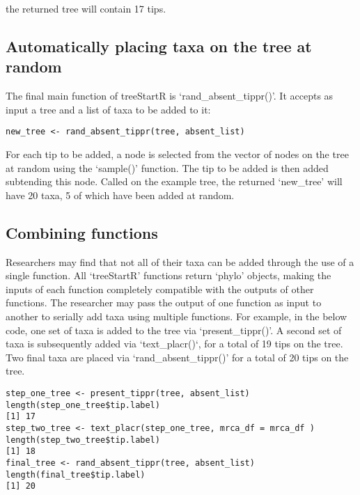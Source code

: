 \documentclass[11pt]{article}
\begin{document}
the returned tree will contain 17 tips.

\subsection{Automatically placing taxa on the tree at random}

The final main function of treeStartR is `rand\_absent\_tippr()'. 
It accepts as input a tree and a list of taxa to be added to it:

{\tt \begin{snugshade*}
\begin{lstlisting}
new_tree <- rand_absent_tippr(tree, absent_list)
\end{lstlisting}
\end{snugshade*}}

For each tip to be added, a node is selected from the vector of nodes on the tree at random using the `sample()' function.
The tip to be added is then added subtending this node.
Called on the example tree, the returned `new\_tree' will have 20 taxa, 5 of which have been added at random.

\subsection{Combining functions}

Researchers may find that not all of their taxa can be added through the use of a single function.
All `treeStartR' functions return `phylo' objects, making the inputs of each function completely compatible with the outputs of other functions.
The researcher may pass the output of one function as input to another to serially add taxa using multiple functions.
For example, in the below code, one set of taxa is added to the tree via `present\_tippr()'.
A second set of taxa is subsequently added via `text\_placr()`, for a total of 19 tips on the tree.
Two final taxa are placed via `rand\_absent\_tippr()' for a total of 20 tips on the tree.

 {\tt \begin{snugshade*}
\begin{lstlisting}
step_one_tree <- present_tippr(tree, absent_list)
length(step_one_tree$tip.label)
[1] 17
step_two_tree <- text_placr(step_one_tree, mrca_df = mrca_df )
length(step_two_tree$tip.label)
[1] 18
final_tree <- rand_absent_tippr(tree, absent_list)
length(final_tree$tip.label)
[1] 20
\end{lstlisting}
\end{snugshade*}}
\end{document}

